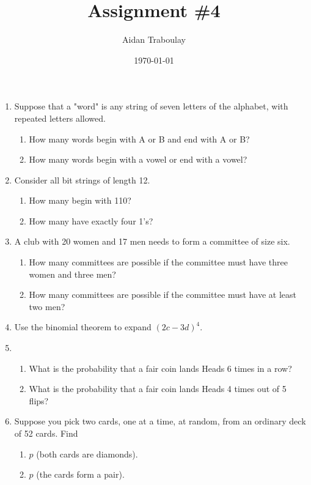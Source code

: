 \documentclass[12pt]{article}
\title{Assignment \#4}
\author{Aidan Traboulay}
\date{\today}
\begin{document}
\maketitle
\begin{enumerate}[leftmargin=\labelsep]
\item Suppose that a "word" is any string of seven letters of the alphabet, with repeated letters allowed.
    \begin{enumerate}
        \item How many words begin with A or B and end with A or B?
        \item How many words begin with a vowel or end with a vowel?
    \end{enumerate}

\item Consider all bit strings of length 12.
    \begin{enumerate}
        \item How many begin with 110?
        \item How many have exactly four 1’s?
    \end{enumerate}

\item A club with 20 women and 17 men needs to form a committee of size six.
    \begin{enumerate}
        \item How many committees are possible if the committee must have three women and three men?
        \item How many committees are possible if the committee must have at least two men?
    \end{enumerate}

\item Use the binomial theorem to expand $(2c - 3d)^4.$

\item 
    \begin{enumerate}
        \item What is the probability that a fair coin lands Heads 6 times in a row?
        \item What is the probability that a fair coin lands Heads 4 times out of 5 flips?
    \end{enumerate}

\item Suppose you pick two cards, one at a time, at random, from an ordinary deck of
52 cards. Find
    \begin{enumerate}
        \item $ p $ (both cards are diamonds).
        \item $ p $ (the cards form a pair).
    \end{enumerate}
    

\end{enumerate}
\end{document}
